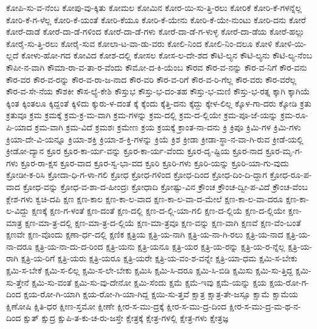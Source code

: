{ಕೋಪಿ-ಸು-ವ-ನೆಂಬ
ಕೋಪು-ವು-ಕ್ಕಿತು
ಕೋಮಲ
ಕೋಮಿನ
ಕೋರ-ಯಿ-ಸು-ತ್ತಿ-ರಲು
ಕೋರಿಕೆ
ಕೋರಿ-ಕೆ-ಗಳನ್ನೆಲ್ಲ
ಕೋರಿ-ಕೆ-ಗ-ಳೆಲ್ಲ
ಕೋರಿ-ಕೆ-ಯಂತೆ
ಕೋರಿ-ಕೆಯೂ
ಕೋರಿ-ಕೆ-ಯೇನು
ಕೋರಿ-ಕೆ-ಯೇ-ನುಂಟು
ಕೋರಿ-ದನು
ಕೋರೆ
ಕೋರೆ-ದಾಡೆ
ಕೋರೆ-ದಾ-ಡೆ-ಗಳಿಂದ
ಕೋರೆ-ದಾ-ಡೆ-ಗಳು
ಕೋರೆ-ದಾ-ಡೆ-ಗ-ಳುಳ್ಳ
ಕೋರೆ-ದಾ-ಡೆಯ
ಕೋರೆ-ಹಲ್ಲು
ಕೋರೈ-ಸು-ತ್ತಿ-ರಲು
ಕೋರೈ-ಸುವ
ಕೋಲಾ-ಟ-ವಾ-ಡು-ವರು
ಕೋಲಿ-ನಿಂದ
ಕೋಲಿ-ನಿಂ-ದಲೂ
ಕೋಳಿ
ಕೋಳಿ-ಯಿ-ಲ್ಲದೆ
ಕೋಳು-ಹೋ-ಗದ
ಕೋವಿದ
ಕೋಶ-ದಲ್ಲಿ
ಕೋಸಲ
ಕೋಸ-ಲ-ದೇ-ಶದ
ಕೌಟಿ-ಲ್ಯನ
ಕೌಟಿ-ಲ್ಯನು
ಕೌಟಿ-ಲ್ಯ-ನೆಂಬ
ಕೌಪೀ-ನ-ವಾಗಿ
ಕೌಮಾ-ರಾ-ವ-ತಾ-ರ-ವೆಂದು
ಕೌಮೋ-ದ-ಕಿ-ಯೆಂಬ
ಕೌರವ
ಕೌರ-ವ-ನನ್ನು
ಕೌರ-ವ-ನಿಗೆ
ಕೌರ-ವನು
ಕೌರ-ವರ
ಕೌರ-ವ-ರನ್ನು
ಕೌರ-ವ-ರಾ-ಜ-ನಾದ
ಕೌರ-ವರಿ
ಕೌರ-ವ-ರಿಗೆ
ಕೌರ-ವ-ರಿ-ಗೆಲ್ಲ
ಕೌರ-ವರು
ಕೌರ-ವರೆಲ್ಲ
ಕೌರ-ವ-ಸೇ-ನೆಯ
ಕೌಶಕೀ
ಕೌಸ-ಲ್ಯೆ-ಕೇಶಿ
ಕೌಸ್ತುಭ
ಕೌಸ್ತು-ಭ-ದಂ-ತಹ
ಕೌಸ್ತು-ಭ-ಮಣಿ
ಕೌಸ್ತು-ಭ-ರತ್ನ
ಕ್ಕಾಗಿ
ಕ್ಕಾಗಿಯೆ
ಕ್ಕಿಂತ
ಕ್ಕಿಂತಲೂ
ಕ್ಕಿದ್ದಂತೆ
ಕ್ಕಿಳಿದು
ಕ್ಕುರು-ಳ-ದಂತೆ
ಕ್ಕೆ
ಕ್ಕೆಂದು
ಕ್ಕೆತ್ತಿ-ದನು
ಕ್ಕೆದ್ದು
ಕ್ಕೇಳ-ಲಿಲ್ಲ
ಕ್ಕೊಳ-ಗಾ-ದರು
ಕ್ಕೋಡಿ
ಕ್ರತು
ಕ್ರತುವೂ
ಕ್ರಮ
ಕ್ರಮಕ್ಕೆ
ಕ್ರಮ-ಕ್ರ-ಮ-ವಾಗಿ
ಕ್ರಮ-ಗಳನ್ನು
ಕ್ರಮ-ದಲ್ಲಿ
ಕ್ರಮ-ದ-ಲ್ಲಿಯೇ
ಕ್ರಮ-ಪೂ-ಜೆ-ಯನ್ನು
ಕ್ರಮ-ರೂ-ಪಿ-ಯಾದ
ಕ್ರಮ-ವಾಗಿ
ಕ್ರಮ-ವಿದೆ
ಕ್ರಮಶಃ
ಕ್ರಮೇಣ
ಕ್ರಯ
ಕ್ರಯಕ್ಕೆ
ಕ್ರಾಂತ-ನಾ-ದನು
ಕ್ರಿ
ಕ್ರಿಪೂ
ಕ್ರಿಮಿ-ಗಳ
ಕ್ರಿಮಿ-ಗಳು
ಕ್ರಿಯಾ-ದೇ-ವಿ-ಯನ್ನೂ
ಕ್ರಿಯಾ-ಶಕ್ತಿ
ಕ್ರಿಯಾ-ಶ-ಕ್ತಿ-ಗಳನ್ನು
ಕ್ರಿಯೆ
ಕ್ರಿಶ
ಕ್ರೀಡಾ
ಕ್ರೀಡಾ-ಸ್ಥಾ-ನ-ವಾ-ಗಿ-ರುವ
ಕ್ರೀಡೆ-ಯಲ್ಲಿ
ಕ್ರೀಡೋ-ದ್ಯಾನ
ಕ್ರೂರ
ಕ್ರೂರ-ಕಾ-ರ್ಯ-ವನ್ನು
ಕ್ರೂರ-ಕಾ-ರ್ಯ-ವೆಂದು
ಕ್ರೂರ-ದೃ-ಷ್ಟಿಯ
ಕ್ರೂರ-ನಾದ
ಕ್ರೂರ-ಮೃ-ಗ-ಗಳು
ಕ್ರೂರ-ರಾ-ಕ್ಷಸ
ಕ್ರೂರ-ವಾದ
ಕ್ರೂರ-ಸ್ವ-ಭಾ-ವದ
ಕ್ರೂರಿ
ಕ್ರೂರಿ-ಗಳು
ಕ್ರೂರಿ-ಯನ್ನು
ಕ್ರೂರಿ-ಯಾ-ಗು-ವುದು
ಕ್ರೋಡೀ-ಕ-ರಿಸಿ
ಕ್ರೋದಾ-ಧಿ-ಗ-ಳಾ-ಗಲಿ
ಕ್ರೋಧ
ಕ್ರೋಧ-ಗಳಿಂದ
ಕ್ರೋಧ-ದಿಂದ
ಕ್ರೋಧ-ದಿಂ-ದಿ-ದ್ದಾಗ
ಕ್ರೋಧ-ರೂ-ಪ-ವಾದ
ಕ್ರೋಧ-ವನ್ನು
ಕ್ರೋಧ-ವ-ಶಾ-ದ-ಹೀಂದ್ರಃ
ಕ್ರೋಧಾದಿ
ಕ್ರೋಷ್ಟು-ವಿನ
ಕ್ರೌಂಚ
ಕ್ರೌಂಚ-ದ್ವೀ-ಪ-ವಿದೆ
ಕ್ರೌಂಚ-ವೆಂಬ
ಕ್ಲೇಶ-ಗಳು
ಕ್ವಚಿ-ದಪಿ
ಕ್ಷಣ
ಕ್ಷಣ-ಕಾಲ
ಕ್ಷಣ-ಕಾ-ಲ-ವಾದ
ಕ್ಷಣ-ಕಾ-ಲ-ವಾ-ದ-ಮೇಲೆ
ಕ್ಷಣ-ಕಾ-ಲ-ವಾ-ದರೂ
ಕ್ಷಣ-ಕಾ-ಲ-ವಿದ್ದು
ಕ್ಷಣಕ್ಕೆ
ಕ್ಷಣ-ಗ-ಳಂತೆ
ಕ್ಷಣ-ದಂತೆ
ಕ್ಷಣ-ದಲ್ಲಿ
ಕ್ಷಣ-ದ-ಲ್ಲಿ-ಯಾ-ಗಲಿ
ಕ್ಷಣ-ದ-ಲ್ಲಿಯೆ
ಕ್ಷಣ-ದ-ಲ್ಲಿಯೇ
ಕ್ಷಣ-ಮಾತ್ರ
ಕ್ಷಣ-ಮಾ-ತ್ರ-ದಲ್ಲಿ
ಕ್ಷಣ-ಮಾ-ತ್ರ-ದ-ಲ್ಲಿಯೆ
ಕ್ಷಣ-ಮಾ-ತ್ರವೂ
ಕ್ಷಣ-ವನ್ನು
ಕ್ಷಣ-ವಾಗಿ
ಕ್ಷಣವೆ
ಕ್ಷಣ-ವೆಂ-ಬಂತೆ
ಕ್ಷಣವೇ
ಕ್ಷಣ-ವೊಂದು
ಕ್ಷಣಾ-ರ್ಧ-ದಲ್ಲಿ
ಕ್ಷಣಿಕ
ಕ್ಷತ್ರಿಯ
ಕ್ಷತ್ರಿ-ಯ-ನಾಗಿ
ಕ್ಷತ್ರಿ-ಯ-ನಾ-ಗಿ-ರಲು
ಕ್ಷತ್ರಿ-ಯ-ನಾದ
ಕ್ಷತ್ರಿ-ಯ-ನಾ-ದರೂ
ಕ್ಷತ್ರಿ-ಯ-ನಾ-ದು-ದ-ರಿಂದ
ಕ್ಷತ್ರಿ-ಯನು
ಕ್ಷತ್ರಿ-ಯನೂ
ಕ್ಷತ್ರಿ-ಯರ
ಕ್ಷತ್ರಿ-ಯ-ರನ್ನು
ಕ್ಷತ್ರಿ-ಯ-ರ-ನ್ನೆಲ್ಲ
ಕ್ಷತ್ರಿ-ಯ-ರಾಗಿ
ಕ್ಷತ್ರಿ-ಯ-ರಿಗೆ
ಕ್ಷತ್ರಿ-ಯರು
ಕ್ಷತ್ರಿ-ಯರೂ
ಕ್ಷತ್ರಿ-ಯರೇ
ಕ್ಷತ್ರಿ-ಯ-ವಂ-ಶ-ವನ್ನೇ
ಕ್ಷತ್ರಿ-ಯಾ-ಧಮ
ಕ್ಷಮಿ-ಸ-ಬೇಕು
ಕ್ಷಮಿ-ಸ-ಬೇಕೆ
ಕ್ಷಮಿ-ಸ-ಲಿಲ್ಲ
ಕ್ಷಮಿ-ಸ-ಲೇ-ಬೇಕು
ಕ್ಷಮಿಸಿ
ಕ್ಷಮಿ-ಸಿ-ದರೂ
ಕ್ಷಮಿ-ಸಿ-ಬಿಡಿ
ಕ್ಷಮಿಸು
ಕ್ಷಮಿ-ಸು-ತ್ತಿದ್ದ
ಕ್ಷಮಿ-ಸು-ತ್ತೇನೆ
ಕ್ಷಮಿ-ಸು-ವಂತೆ
ಕ್ಷಮಿ-ಸು-ವು-ದೇನೋ
ಕ್ಷಮಿ-ಸೆಂದು
ಕ್ಷಮೆ
ಕ್ಷಮೆ-ಇವು
ಕ್ಷಮೆ-ಯನ್ನು
ಕ್ಷಯ
ಕ್ಷಯ-ರೋ-ಗ-ದಿಂದ
ಕ್ಷಯ-ರೋ-ಗಿ-ಯಾಗಿ
ಕ್ಷಯ-ರೋ-ಗಿ-ಯಾ-ಗಿದ್ದ
ಕ್ಷಯಿ-ಸು-ತ್ತವೆ
ಕ್ಷಾತ್ರ
ಕ್ಷಾತ್ರ-ತೇ-ಜಸ್ಸೂ
ಕ್ಷಾಮೆ
ಕ್ಷಾಮೆಯ
ಕ್ಷಿಣೋಷಿ
ಕ್ಷಿತಿ-ಧರ
ಕ್ಷೀಣ-ಸ್ತಮೋ
ಕ್ಷೀಣೇ
ಕ್ಷೀರ-ಸ-ಮು-ದ್ರಕ್ಕೆ
ಕ್ಷೀರ-ಸ-ಮು-ದ್ರ-ದಿಂದ
ಕ್ಷೀರ-ಸ-ಮು-ದ್ರ-ಮ-ಥ-ನ-ದಿಂದ
ಕ್ಷುತ್
ಕ್ಷುದ್ರ
ಕ್ಷುಪಿ-ತ-ಕು-ಚ-ರು-ಜಸ್ತೇ
ಕ್ಷೇತ್ರಕ್ಕೆ
ಕ್ಷೇತ್ರ-ಗಳಲ್ಲಿ
ಕ್ಷೇತ್ರ-ಗಳು
ಕ್ಷೇತ್ರಜ್ಞ
}
